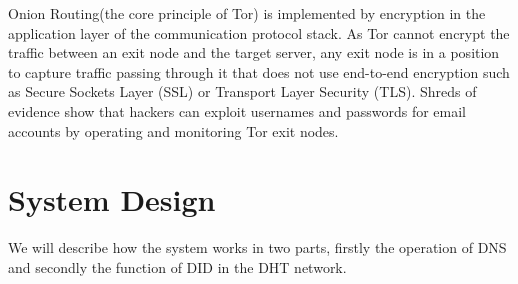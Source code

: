 \documentclass[twocolumn]{article}
\begin{document}
Onion Routing(the core principle of Tor\cite{TorNetwork}) is implemented by encryption in the application layer of the communication protocol stack. As Tor cannot encrypt the traffic between an exit node and the target server, any exit node is in a position to capture traffic passing through it that does not use end-to-end encryption such as Secure Sockets Layer (SSL) or Transport Layer Security (TLS). Shreds of evidence show that hackers can exploit usernames and passwords for email accounts by operating and monitoring Tor exit nodes.
\section{System Design}

We will describe how the system works in two parts, firstly the operation of DNS and secondly the function of DID in the DHT network.
\end{document}
